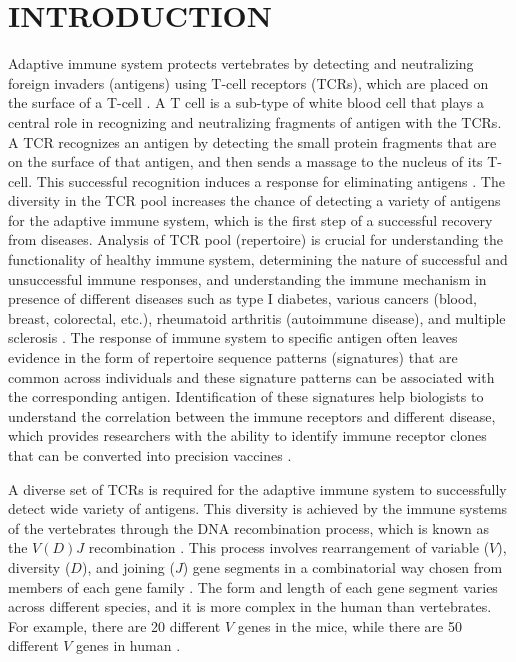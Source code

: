 \chapter{INTRODUCTION\label{chapter:introduction}}

Adaptive immune system protects vertebrates by detecting and neutralizing foreign invaders (antigens) using T-cell receptors (TCRs), which are placed on the surface of a T-cell \cite{b3}. A T cell is a sub-type of white blood cell that plays a central role in recognizing and neutralizing fragments of antigen with the TCRs. A TCR recognizes an antigen by detecting the small protein fragments that are on the surface of that antigen, and then sends a massage to the nucleus of its T-cell. This successful recognition induces a response for eliminating antigens \cite{b9}. The diversity in the TCR pool increases the chance of detecting a variety of antigens for the adaptive immune system, which is the first step of a successful recovery from diseases. Analysis of TCR pool (repertoire) is crucial for understanding the functionality of healthy immune system, determining the nature of successful and unsuccessful immune responses, and understanding the immune mechanism in presence of different diseases such as type I diabetes, various cancers (blood, breast, colorectal, etc.), rheumatoid arthritis (autoimmune disease), and  multiple sclerosis \cite{b6}. The response of immune system to specific antigen often leaves evidence in the form of repertoire sequence patterns (signatures) that are common across individuals and these signature patterns can be associated with the corresponding antigen. Identification of these signatures help biologists to understand the correlation between the immune receptors and different disease, which provides researchers with the ability to identify immune receptor clones that can be converted into precision vaccines \cite{b1, b7, b8}.

A diverse set of TCRs is required for the adaptive immune system to successfully detect wide variety of antigens. This diversity is achieved by the immune systems of the vertebrates through the DNA recombination process, which is known as the $V(D)J$ recombination \cite{b4}. This process involves rearrangement of variable ($V$), diversity ($D$), and joining ($J$) gene segments in a combinatorial way chosen from members of each gene family \cite{b4,b5}. The form and length of each gene segment varies across different species, and it is more complex in the human than vertebrates. For example, there are 20 different $V$ genes in the mice, while there are 50 different $V$ genes in human \cite{b37}. 

